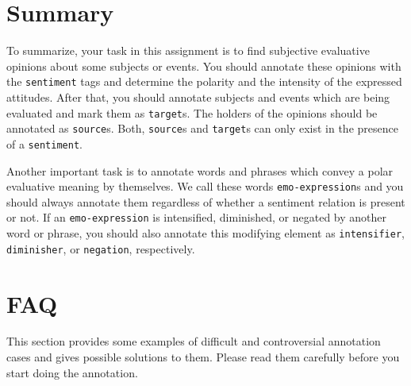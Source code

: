 \documentclass[11pt,a4paper]{article}
\theoremstyle{mytheoremstyle}
\begin{document}
\section{Summary}\label{sec:summary}
To summarize, your task in this assignment is to find subjective
evaluative opinions about some subjects or events.  You should
annotate these opinions with the \texttt{sentiment} tags and determine
the polarity and the intensity of the expressed attitudes.  After
that, you should annotate subjects and events which are being
evaluated and mark them as \texttt{target}s.  The holders of the
opinions should be annotated as \texttt{source}s.  Both,
\texttt{source}s and \texttt{target}s can only exist in the presence
of a \texttt{sentiment}.

Another important task is to annotate words and phrases which convey a
polar evaluative meaning by themselves.  We call these words
\texttt{emo-expression}s and you should always annotate them
regardless of whether a sentiment relation is present or not.  If an
\texttt{emo-expression} is intensified, diminished, or negated by
another word or phrase, you should also annotate this modifying
element as \texttt{intensifier}, \texttt{diminisher}, or
\texttt{negation}, respectively.

\section{FAQ}\label{sec:faq}
This section provides some examples of difficult and controversial
annotation cases and gives possible solutions to them.  Please read
them carefully before you start doing the annotation.
\end{document}
